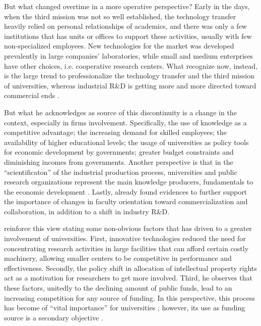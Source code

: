 But what changed overtime in a more operative perspective? Early in the days, when the third mission was not so well established, the technology transfer heavily relied on personal relationships of academics, and there was only a few institutions that has units or offices to support these activities, usually with few non-specialized employees. New technologies for the market was developed prevalently in large companies' laboratories, while small and medium enterprises have other choices, i.e. cooperative research centers. What \citet{Geuna2009}recognize now, instead, is the large trend to professionalize the technology transfer and the third mission of universities, whereas industrial R\&D is getting more and more directed toward commercial ends \citep{Fritsch2007}.

But what he acknowledges as source of this discontinuity is a change in the context, especially in firms involvement. Specifically, the use of knowledge as a competitive advantage; the increasing demand for skilled employees; the availability of higher educational levels; the usage of universities as policy tools for economic development by governments; greater budget constraints and diminishing incomes from governments. Another perspective is that in the \enquote{scientificaton} of the industrial production process, universities and public research organizations represent the main knowledge producers, fundamentals to the economic development \citep{Balderi2007}. Lastly, already \citet{Thursby2002}found evidences to further support the importance of changes in faculty orientation toward commercialization and collaboration, in addition to a shift in industry R\&D.

\citet{Baldini2007} reinforce this view stating some non-obvious factors that has driven to a greater involvement of universities. First, innovative technologies reduced the need for concentrating research activities in large facilities that can afford certain costly machinery, allowing smaller centers to be competitive in performance and effectiveness. Secondly, the policy shift in allocation of intellectual property rights act as a motivation for researchers to get more involved. Third, he observes that these factors, unitedly to the declining amount of public funds, lead to an increasing competition for any source of funding. In this perspective, this process has become of \enquote{vital importance} for universities \citep{Muscio2008}; however, its use as funding source is a secondary objective \citep{Jensen1998}.

